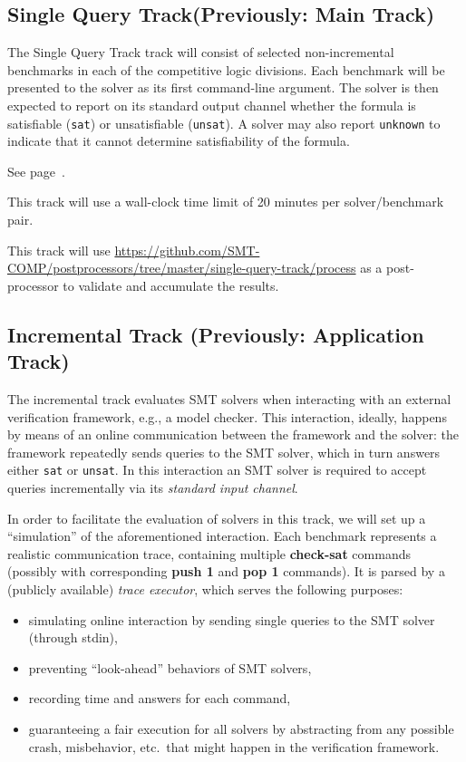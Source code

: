 \documentclass[12pt]{article}
\newcommand{\akey}[1]{\textbf{#1}\xspace}
\newcommand{\maintrack}{Single Query Track\xspace}
\begin{document}
\subsection{\maintrack (Previously: Main Track)}
\label{sec:exec:single}

The \maintrack track will consist of selected non-incremental benchmarks in
each of the competitive logic divisions.  Each benchmark will be presented to
the solver as its first command-line argument.  The solver is then expected to
report on its standard output channel whether the formula is satisfiable
(\texttt{sat}) or unsatisfiable (\texttt{unsat}).  A solver may also report
\texttt{unknown} to indicate that it cannot determine satisfiability of the
formula.

 See page~\pageref{benchmark-selection}.

This track will use a wall-clock time limit of 20 minutes per solver/benchmark
pair.

This track will use
{\url{https://github.com/SMT-COMP/postprocessors/tree/master/single-query-track/process}}
as a post-processor
to validate and accumulate the results.

\subsection{Incremental Track (Previously: Application Track)}
\label{sec:exec:app}

The incremental track evaluates SMT solvers when interacting with an
external verification framework, e.g., a model checker. This
interaction, ideally, happens by means of an online communication
between the framework and the solver: the framework repeatedly sends
queries to the SMT solver, which in turn answers either \texttt{sat}
or \texttt{unsat}.  In this interaction an SMT solver is required to
accept queries incrementally via its \emph{standard input channel}.

In order to facilitate the evaluation of solvers in this track, we will set up
a ``simulation'' of the aforementioned interaction.  Each benchmark represents
a realistic communication trace, containing multiple \akey{check-sat} commands
(possibly with corresponding \akey{push 1} and \akey{pop 1} commands). It is
parsed by a (publicly available) \emph{trace executor},
which serves the following purposes:

\begin{itemize}
  \item simulating online interaction by sending single queries to the SMT
    solver (through stdin),
  \item preventing ``look-ahead'' behaviors of SMT solvers,
  \item recording time and answers for each command,
  \item guaranteeing a fair execution for all solvers by abstracting
  from any possible crash, misbehavior, etc.\ that might happen in the
  verification framework.
\end{itemize}
\end{document}
